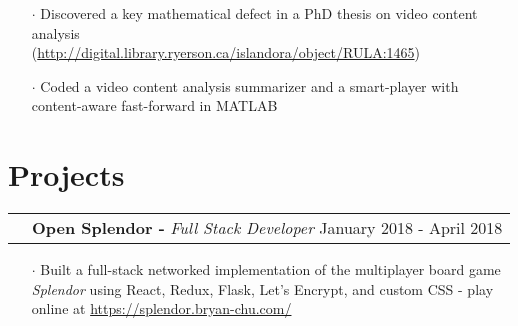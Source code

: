 \documentclass[a4paper, oneside, final]{scrartcl} %
\newcommand{\gray}{\rowcolor[gray]{.90}} %
\begin{document}
\begin{center}
\begin{itemize}
    \item[$\cdot$] Discovered a key mathematical defect in a PhD thesis on video content analysis \\(\url{http://digital.library.ryerson.ca/islandora/object/RULA:1465})\\
    \item[$\cdot$] Coded a video content analysis summarizer and a smart-player with content-aware fast-forward in MATLAB\\

  \end{itemize}

  \vspace{-0.2cm}



  \section{Projects}
  \renewcommand{\arraystretch}{1.3}

  \begin{tabularx}{1.00\linewidth}{>{\raggedleft\scshape}p{0cm}X}
    \gray& \textbf{Open Splendor -} \textit{Full Stack Developer} \hfill {January 2018 - April 2018}\\
  \end{tabularx}
  \begin{itemize}\itemsep-0.2cm
      \vspace{-0.1cm}
    \item[$\cdot$] Built a full-stack networked implementation of the multiplayer board game \textit{Splendor} using React, Redux, Flask, Let's Encrypt, and custom CSS - play online at \href{https://splendor.bryan-chu.com/}{https://splendor.bryan-chu.com/}\\
  \end{itemize}
  \vspace{-0.2cm}


\end{center}
\end{document}
